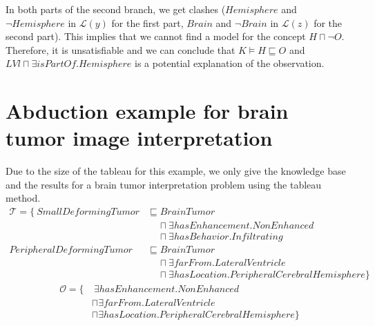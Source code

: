 \documentclass{article}
\begin{document}
\begin{center}
\end{center}

In both parts of the second branch, we get clashes ($Hemisphere$ and $\neg Hemisphere$ in $\mathcal{L}(y)$ for the first part, $Brain$ and $\neg Brain$ in $\mathcal{L}(z)$ for the second part).
This implies that we cannot find a model for the concept $H\sqcap \neg O$. Therefore, it is unsatisfiable and we can conclude that $K\vDash H\sqsubseteq O$ and $LVl\sqcap \exists isPartOf.Hemisphere$ is a potential
explanation of the observation.

\section{Abduction example for brain tumor image interpretation}
\label{Appendix B}
Due to the size of the tableau for this example, we only give the knowledge base and the results for a brain tumor interpretation problem using the tableau method.
\begin{align*}
\mathcal{T}=\{~SmallDeformingTumor &\sqsubseteq BrainTumor\\
 &~~~~~\sqcap \exists hasEnhancement. NonEnhanced \\
&~~~~~\sqcap \exists hasBehavior. Infiltrating  \\
PeripheralDeformingTumor &\sqsubseteq BrainTumor\\
&~~~~~ \sqcap \exists farFrom. LateralVentricle \\
&~~~~~ \sqcap \exists hasLocation. PeripheralCerebralHemisphere \} 
\end{align*}\vspace{-0.9cm}
\begin{align*}
\mathcal{O} =\{&~\exists hasEnhancement. NonEnhanced \\
 &\sqcap \exists farFrom. LateralVentricle \\
&\sqcap \exists hasLocation. PeripheralCerebralHemisphere \} 
\end{align*}
\end{document}
